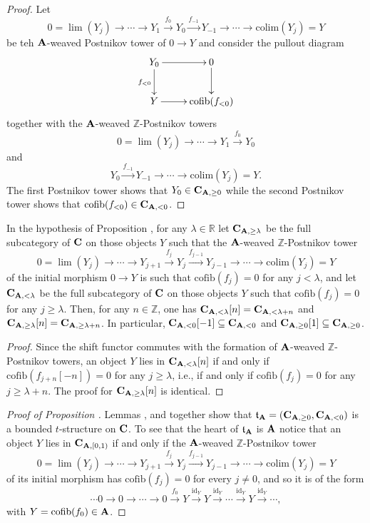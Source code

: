 \begin{proof}
Let
\[
0 =\lim(Y_j)\to\cdots \to Y_{1} \xrightarrow{f_{0}} Y_{0} \xrightarrow{f_{-1}}Y_{-1}\to \cdots\to \mathrm{colim}(Y_j)=Y
\]
be teh $\textbf{A}$-weaved Postnikov tower of $0\to Y$ and consider the pullout diagram
\[
\xymatrix{
Y_0\ar[r]\ar[d]_{f_{<0}}&0\ar[d]\\
Y\ar[r]&\mathrm{cofib}(f_{<0})
}\]
together with the $\textbf{A}$-weaved $\mathbb{Z}$-Postnikov towers
\[
0 =\lim(Y_j)\to\cdots \to Y_{1} \xrightarrow{f_{0}} Y_{0} 
\]
and
\[
Y_{0}\xrightarrow{f_{-1}}Y_{-1}\to \cdots\to \mathrm{colim}(Y_j)=Y.
\]
The first Postnikov tower shows that $Y_0\in \textbf{C}_{\textbf{A},\geq 0}$ while the second Postnikov tower shows that $\mathrm{cofib}(f_{<0})\in  \textbf{C}_{\textbf{A},<0}$.
\end{proof}
\begin{lemma}\label{tre}
In the hypothesis of Proposition , for any $\lambda\in \mathbb{R}$ let
$\textbf{C}_{\textbf{A},\geq \lambda}$ be the full subcategory of $\textbf{C}$ on those objects $Y$ such that  the $\textbf{A}$-weaved $\mathbb{Z}$-Postnikov tower
\[
0 =\lim(Y_j)\to\cdots \to Y_{j+1} \xrightarrow{f_{j}} Y_{j} \xrightarrow{f_{j-1}}Y_{j-1}\to \cdots\to \mathrm{colim}(Y_j)=Y
\]
of the initial morphism $0\to Y$ is such that $\mathrm{cofib}(f_j)=0$ for any $j<\lambda$, and let $\textbf{C}_{\textbf{A},< \lambda}$ be the full subcategory of $\textbf{C}$ on those objects $Y$ such that $\mathrm{cofib}(f_j)=0$ for any $j\geq \lambda$. 
Then, for any $n\in\mathbb{Z}$, one has $\textbf{C}_{\textbf{A},< \lambda}[n]=\textbf{C}_{\textbf{A},< \lambda+n}$ and $\textbf{C}_{\textbf{A},\geq \lambda}[n]=\textbf{C}_{\textbf{A},\geq \lambda+n}$. In particular, $\textbf{C}_{\textbf{A},<0}[-1]\subseteq \textbf{C}_{\textbf{A},<0}$ and $\textbf{C}_{\textbf{A},\geq 0}[1]\subseteq\textbf{C}_{\textbf{A},\geq 0}$.
\end{lemma}
\begin{proof}
Since the shift functor commutes with the formation of  $\textbf{A}$-weaved $\mathbb{Z}$-Postnikov towers, an object $Y$ lies in $\textbf{C}_{\textbf{A},< \lambda}[n]$ if and only if $\mathrm{cofib}(f_{j+n}[-n])=0$ for any $j\geq \lambda$, i.e.,  if and only if $\mathrm{cofib}(f_j)=0$ for any $j\geq \lambda+n$.
The proof for $\textbf{C}_{\textbf{A},\geq \lambda}[n]$ is identical.
\end{proof}
\begin{proof}[Proof of Proposition ]
Lemmas ,  and  together show that $\mathfrak{t}_{\textbf{A}}=(\textbf{C}_{\textbf{A},\geq 0}, \textbf{C}_{\textbf{A},<0})$ is a bounded $t$-structure on $\textbf{C}$. To see that the heart of  $\mathfrak{t}_{\textbf{A}}$ is $\textbf{A}$ notice that an object $Y$ lies in $\textbf{C}_{\textbf{A},[0,1)}$ if and only if the $\textbf{A}$-weaved $\mathbb{Z}$-Postnikov tower
\[
0 =\lim(Y_j)\to\cdots \to Y_{j+1} \xrightarrow{f_{j}} Y_{j} \xrightarrow{f_{j-1}}Y_{j-1}\to \cdots\to \mathrm{colim}(Y_j)=Y
\]
of its initial morphism has $\mathrm{cofib}(f_j)=0$ for every $j\neq0$, and so it is of the form
\[
\cdots 0 \to 0\to \cdots \to 0\xrightarrow{f_{0}} Y \xrightarrow{\mathrm{id}_Y}Y\xrightarrow{\mathrm{id}_Y} \cdots\xrightarrow{\mathrm{id}_Y}Y\xrightarrow{\mathrm{id}_Y}\cdots,\] 
with $Y=\mathrm{cofib}(f_0)\in \textbf{A}$.
\end{proof}
